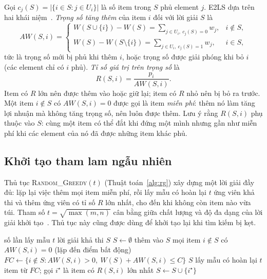 Gọi $c_j(S)=|\{i\in S: j\in U_i\}|$ là số item trong $S$ phủ element $j$. E2LS dựa trên hai khái niệm~\cite{Zhu2022}. \emph{Trọng số tăng thêm} của item $i$ đối với lời giải $S$ là
\begin{equation}
AW(S,i)=
\begin{cases}
W(S\cup\{i\})-W(S)=\sum_{j\in U_i,\ c_j(S)=0}w_j, & i\notin S,\\[3pt]
W(S)-W(S\setminus\{i\})=\sum_{j\in U_i,\ c_j(S)=1}w_j, & i\in S,
\end{cases}
\label{eq:aw}
\end{equation}
tức là trọng số mới bị phủ khi thêm $i$, hoặc trọng số được giải phóng khi bỏ $i$ (các element chỉ có $i$ phủ). \emph{Tỉ số giá trị trên trọng số} là
\begin{equation}
R(S,i)=\frac{p_i}{AW(S,i)} .
\label{eq:ratio}
\end{equation}
Item có $R$ lớn nên được thêm vào hoặc giữ lại; item có $R$ nhỏ nên bị bỏ ra trước. Một item $i\notin S$ có $AW(S,i)=0$ được gọi là item \emph{miễn phí}: thêm nó làm tăng lợi nhuận mà không tăng trọng số, nên luôn được thêm. Lưu ý rằng $R(S,i)$ phụ thuộc vào $S$: cùng một item có thể đắt khi đứng một mình nhưng gần như miễn phí khi các element của nó đã được những item khác phủ.

\subsection{Khởi tạo tham lam ngẫu nhiên}

Thủ tục \textsc{Random\_Greedy}$(t)$ (Thuật toán~\ref{alg:rg}) xây dựng một lời giải đầy đủ: lặp lại việc thêm mọi item miễn phí, rồi lấy mẫu có hoàn lại $t$ ứng viên khả thi và thêm ứng viên có tỉ số $R$ lớn nhất, cho đến khi không còn item nào vừa túi. Tham số $t=\sqrt{\max(m,n)}$ cân bằng giữa chất lượng và độ đa dạng của lời giải khởi tạo~\cite{Zhu2022}. Thủ tục này cũng được dùng để khởi tạo lại khi tìm kiếm bị kẹt.

\begin{algorithm}[H]
\caption{\textsc{Random\_Greedy}$(t)$}
\label{alg:rg}
\begin{algorithmic}[1]
\Require số lần lấy mẫu $t$
\Ensure lời giải khả thi $S$
\State $S\leftarrow\emptyset$
\Loop
  \State thêm vào $S$ mọi item $i\notin S$ có $AW(S,i)=0$ (lặp đến điểm bất động)
  \State $FC\leftarrow\{i\notin S: AW(S,i)>0,\ W(S)+AW(S,i)\le C\}$
   \Return $S$ \EndIf
  \State lấy mẫu có hoàn lại $t$ item từ $FC$; gọi $i^\star$ là item có $R(S,i)$ lớn nhất
  \State $S\leftarrow S\cup\{i^\star\}$
\EndLoop
\end{algorithmic}
\end{algorithm}

